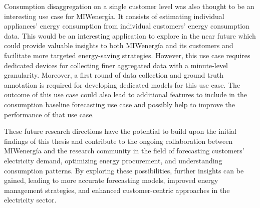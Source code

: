 Consumption disaggregation on a single customer level was also thought to be an interesting use case for MIWenergía.
It consists of estimating individual appliances' energy consumption from individual customers' energy consumption data.
This would be an interesting application to explore in the near future which could provide valuable insights to both MIWenergía and its customers and facilitate more targeted energy-saving strategies.
However, this use case requires dedicated devices for collecting finer aggregated data with a minute-level granularity.
Moreover, a first round of data collection and ground truth annotation is required for developing dedicated models for this use case.
The outcome of this use case could also lead to additional features to include in the consumption baseline forecasting use case and possibly help to improve the performance of that use case.

These future research directions have the potential to build upon the initial findings of this thesis and contribute to the ongoing collaboration between MIWenergía and the research community in the field of forecasting customers' electricity demand, optimizing energy procurement, and understanding consumption patterns.
By exploring these possibilities, further insights can be gained, leading to more accurate forecasting models, improved energy management strategies, and enhanced customer-centric approaches in the electricity sector.
